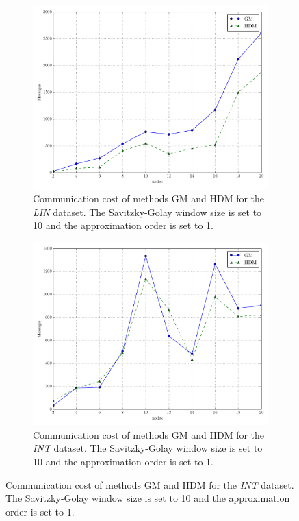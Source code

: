 \begin{figure}[!htb]
\begin{subfigure}{0.32\textwidth}
  \includegraphics[width=\linewidth]{img/main_msg_linear_nodes.pdf}
  \caption{Communication cost of methods GM and HDM for the \emph{LIN} dataset. The Savitzky-Golay window size is set to 10 and the approximation order is set to 1.}
\end{subfigure}\hfill
\begin{subfigure}{0.32\textwidth}
  \includegraphics[width=\linewidth]{img/main_msg_interweaving_nodes.pdf}
  \caption{Communication cost of methods GM and HDM for the \emph{INT} dataset. The Savitzky-Golay window size is set to 10 and the approximation order is set to 1.}

\end{subfigure}
\end{figure}
